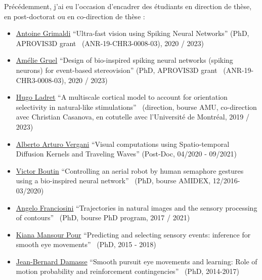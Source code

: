 \documentclass[10pt,french,a4paper,oneside]{article}%
\begin{document}

Précédemment, j'ai eu l'occasion d'encadrer des étudiants en direction de thèse, en post-doctorat ou en co-direction de thèse : %
\begin{itemize}
	\item \href{https://laurentperrinet.github.io/author/antoine-grimaldi/}{Antoine Grimaldi} ``Ultra-fast vision using Spiking Neural Networks'' (PhD, APROVIS3D grant~\textcite{Grimaldi24thesis} (ANR-19-CHR3-0008-03), 2020 / 2023)
	\item \href{https://laurentperrinet.github.io/author/am%C3%A9lie-gruel/}{Amélie Gruel} ``Design of bio-inspired spiking neural networks (spiking neurons) for event-based stereovision'' (PhD, APROVIS3D grant~\textcite{Gruel23thesis} (ANR-19-CHR3-0008-03), 2020 / 2023)
	\item \href{https://laurentperrinet.github.io/author/hugo-ladret/}{Hugo Ladret} ``A multiscale cortical model to account for orientation selectivity in natural-like stimulations''~\textcite{Ladret24thesis}  (direction, bourse AMU, co-direction avec Christian Casanova, en cotutelle avec l'Université de Montréal, 2019 / 2023)
	\item \href{https://laurentperrinet.github.io/author/alberto-arturo-vergani/}{Alberto Arturo Vergani} 	``Visual computations using Spatio-temporal Diffusion Kernels and Traveling Waves'' (Post-Doc, 04/2020 - 09/2021)
	\item \href{https://laurentperrinet.github.io/author/victor-boutin/}{Victor Boutin} 	``Controlling an aerial robot by human semaphore gestures using a bio-inspired neural network''~\textcite{Boutin20thesis} (PhD, bourse AMIDEX, 12/2016-03/2020)
	\item \href{https://laurentperrinet.github.io/author/angelo-franciosini/}{Angelo Franciosini} ``Trajectories in natural images and the sensory processing of contours''~\textcite{Franciosini21thesis} (PhD, bourse PhD program, 2017 / 2021)
	\item \href{https://laurentperrinet.github.io/author/kiana-mansour-pour/}{Kiana Mansour Pour} 	``Predicting and selecting sensory events: inference for smooth eye movements''~\citep{MansourPour19thesis} (PhD, 2015 - 2018)
	\item \href{https://laurentperrinet.github.io/author/jean-bernard-damasse/}{Jean-Bernard Damasse} 	``Smooth pursuit eye movements and learning: Role of motion probability and reinforcement contingencies''~\citep{Damasse18thesis} (PhD, 2014-2017)

\end{itemize}
\end{document}
